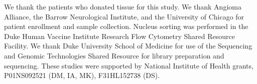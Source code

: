 We thank the patients who donated tissue for this study. We thank Angioma Alliance, the Barrow Neurological Institute, and the University of Chicago for patient enrollment and sample collection. Nucleus sorting was performed in the Duke Human Vaccine Institute Research Flow Cytometry Shared Resource Facility. We thank Duke University School of Medicine for use of the Sequencing and Genomic Technologies Shared Resource for library preparation and sequencing. These studies were supported by National Institute of Health grants, P01NS092521 (DM, IA, MK), F31HL152738 (DS).
